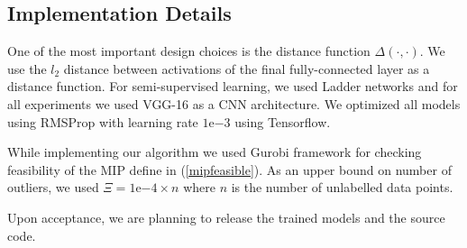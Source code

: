 \documentclass{article}
\begin{document}
\subsection{Implementation Details}
\label{sec:imp}
One of the most important design choices is the distance function $\Delta(\cdot,\cdot)$. We use the $l_2$ distance between activations of the final fully-connected layer as a distance function. For semi-supervised learning, we used Ladder networks\cite{ladder} and for all experiments we used VGG-16\cite{vgg} as a CNN architecture. We optimized all models using RMSProp with learning rate $1\mathrm{e}{-3}$ using Tensorflow\cite{tensorflow}. 

While implementing our algorithm we used Gurobi\cite{gurobi} framework for checking feasibility of the MIP define in (\ref{mipfeasible}). As an upper bound on number of outliers, we used $\Xi=1\mathrm{e}{-4} \times n$ where $n$ is the number of unlabelled data points.

Upon acceptance, we are planning to release the trained models and the source code.
\end{document}
